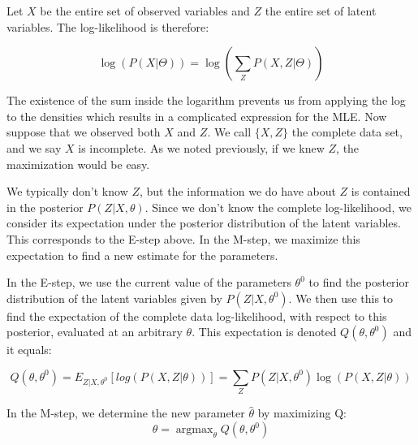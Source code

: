 \documentclass{article}
\DeclareMathOperator*{\argmax}{argmax}
\begin{document}
Let $X$ be the entire set of observed variables and $Z$ the entire set of latent variables. The log-likelihood is therefore:

\[ 
\log {(P(X|\Theta))} = \log \left( {\sum_Z P(X, Z |\Theta)} \right)
\]

The existence of the sum inside the logarithm prevents us from applying the log to the densities which results in a complicated expression for the MLE. Now suppose that we observed both $X$ and $Z$. We call $\{X,Z\}$ the complete data set, and we say $X$ is incomplete. As we noted previously, if we knew $Z$, the maximization would be easy.

We typically don't know $Z$, but the information we do have about $Z$ is contained in the posterior $P(Z|X,\theta)$. Since we don't know the complete log-likelihood, we consider its expectation under the posterior distribution of the latent variables. This corresponds to the E-step above. In the M-step, we maximize this expectation to find a new estimate for the parameters.

In the E-step, we use the current value of the parameters $\theta^0$ to find the posterior distribution of the latent variables given by $P(Z|X,\theta^0)$. We then use this to find the expectation of the complete data log-likelihood, with respect to this posterior, evaluated at an arbitrary $\theta$. This expectation is denoted $Q(\theta,\theta^0)$ and it equals:

\[ 
Q(\theta, \theta^0) = E_{Z | X, \theta^0} [log(P(X,Z|\theta))] = \sum_Z P(Z | X, \theta^0) \log(P(X,Z|\theta))
\]

In the M-step, we determine the new parameter $\hat{\theta}$ by maximizing Q:
\[
\hat{\theta} =  \argmax_{\theta} Q(\theta, \theta^0) 
\]

\end{document}
